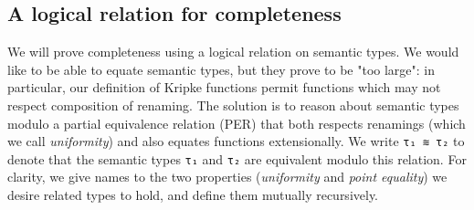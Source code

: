 \documentclass[authoryear, acmsmall, screen, review, nonacm]{acmart}
\begin{document}
\subsection{A logical relation for completeness}
We will prove completeness using a logical relation on semantic types. We would like to be able to equate semantic types, but they prove to be "too large": in particular, our definition of Kripke functions permit functions which may not respect composition of renaming. The solution is to reason about semantic types modulo a partial equivalence relation (PER) that both respects renamings (which we call \emph{uniformity}) and also equates functions extensionally. We write \verb!τ₁ ≋ τ₂! to denote that the semantic types \verb!τ₁! and \verb!τ₂! are equivalent modulo this relation. For clarity, we give names to the two properties (\emph{uniformity} and \emph{point equality}) we desire related types to hold, and define them mutually recursively.

\begin{code}%
\>[0]\AgdaSpace{}%
\AgdaSymbol{:}\AgdaSpace{}%
\AgdaSpace{}%
\AgdaSpace{}%
\AgdaSpace{}%
\AgdaSpace{}%
\AgdaSpace{}%
\AgdaSpace{}%
\AgdaSpace{}%
\AgdaSpace{}%
\<%
\\
\>[0]\AgdaSpace{}%
\AgdaSymbol{:}\AgdaSpace{}%
\AgdaSpace{}%
\AgdaSymbol{\{}\AgdaSymbol{\}}\AgdaSpace{}%
\AgdaSymbol{\{}\AgdaSymbol{\}}\AgdaSpace{}%
\AgdaSymbol{\{}\AgdaSymbol{\}}\AgdaSpace{}%
\AgdaSymbol{(}\AgdaSpace{}%
\AgdaSpace{}%
\AgdaSymbol{:}\AgdaSpace{}%
\AgdaSpace{}%
\AgdaSpace{}%
\AgdaSpace{}%
\AgdaSymbol{)}\AgdaSpace{}%
\AgdaSpace{}%
\<%
\\
\>[0]\AgdaSpace{}%
\AgdaSymbol{:}%
\>[11]\AgdaSpace{}%
\AgdaSymbol{\{}\AgdaSymbol{\}}\AgdaSpace{}%
\AgdaSymbol{\{}\AgdaSymbol{\}}\AgdaSpace{}%
\AgdaSymbol{\{}\AgdaSymbol{\}}\AgdaSpace{}%
\AgdaSpace{}%
\AgdaSpace{}%
\AgdaSpace{}%
\AgdaSpace{}%
\AgdaSpace{}%
\AgdaSpace{}%
\<%
\end{code}
\end{document}
